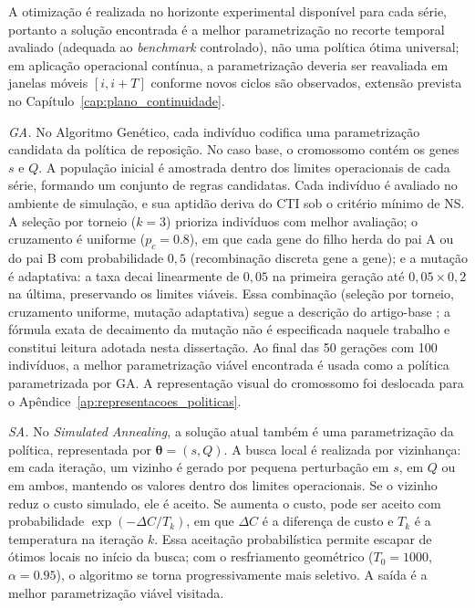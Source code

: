 A otimização é realizada no horizonte experimental disponível para cada série, portanto a solução encontrada é a melhor parametrização no recorte temporal avaliado (adequada ao \textit{benchmark} controlado), não uma política ótima universal; em aplicação operacional contínua, a parametrização deveria ser reavaliada em janelas móveis $[i,i+T]$ conforme novos ciclos são observados, extensão prevista no Capítulo~\ref{cap:plano_continuidade}.

\textit{GA.} No Algoritmo Genético, cada indivíduo codifica uma parametrização candidata da política de reposição. No caso base, o cromossomo contém os genes $s$ e $Q$. A população inicial é amostrada dentro dos limites operacionais de cada série, formando um conjunto de regras candidatas. Cada indivíduo é avaliado no ambiente de simulação, e sua aptidão deriva do CTI sob o critério mínimo de NS. A seleção por torneio ($k=3$) prioriza indivíduos com melhor avaliação; o cruzamento é uniforme ($p_c=0.8$), em que cada gene do filho herda do pai A ou do pai B com probabilidade $0{,}5$ (recombinação discreta gene a gene); e a mutação é adaptativa: a taxa decai linearmente de $0{,}05$ na primeira geração até $0{,}05 \times 0{,}2$ na última, preservando os limites viáveis. Essa combinação (seleção por torneio, cruzamento uniforme, mutação adaptativa) segue a descrição do artigo-base \citep{Zabraoui2025GaDQN}; a fórmula exata de decaimento da mutação não é especificada naquele trabalho e constitui leitura adotada nesta dissertação. Ao final das 50 gerações com 100 indivíduos, a melhor parametrização viável encontrada é usada como a política parametrizada por GA. A representação visual do cromossomo foi deslocada para o Apêndice~\ref{ap:representacoes_politicas}.

\textit{SA.} No \textit{Simulated Annealing}, a solução atual também é uma parametrização da política, representada por $\boldsymbol{\theta}=(s,Q)$. A busca local é realizada por vizinhança: em cada iteração, um vizinho é gerado por pequena perturbação em $s$, em $Q$ ou em ambos, mantendo os valores dentro dos limites operacionais. Se o vizinho reduz o custo simulado, ele é aceito. Se aumenta o custo, pode ser aceito com probabilidade $\exp(-\Delta C / T_k)$, em que $\Delta C$ é a diferença de custo e $T_k$ é a temperatura na iteração $k$. Essa aceitação probabilística permite escapar de ótimos locais no início da busca; com o resfriamento geométrico ($T_0=1000$, $\alpha=0.95$), o algoritmo se torna progressivamente mais seletivo. A saída é a melhor parametrização viável visitada.

